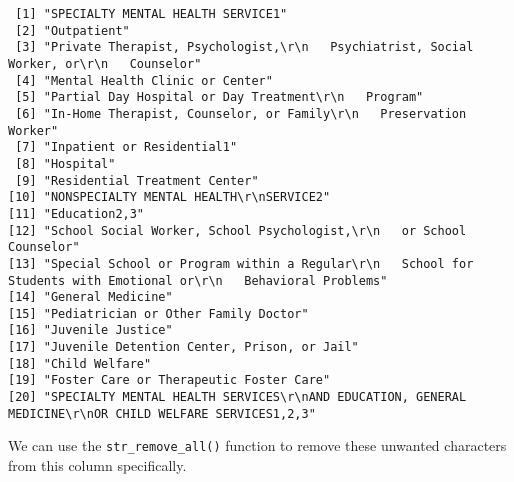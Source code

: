 \documentclass[
]{article}
\begin{document}
\begin{verbatim}
 [1] "SPECIALTY MENTAL HEALTH SERVICE1"                                                                                
 [2] "Outpatient"                                                                                                      
 [3] "Private Therapist, Psychologist,\r\n   Psychiatrist, Social Worker, or\r\n   Counselor"                          
 [4] "Mental Health Clinic or Center"                                                                                  
 [5] "Partial Day Hospital or Day Treatment\r\n   Program"                                                             
 [6] "In-Home Therapist, Counselor, or Family\r\n   Preservation Worker"                                               
 [7] "Inpatient or Residential1"                                                                                       
 [8] "Hospital"                                                                                                        
 [9] "Residential Treatment Center"                                                                                    
[10] "NONSPECIALTY MENTAL HEALTH\r\nSERVICE2"                                                                          
[11] "Education2,3"                                                                                                    
[12] "School Social Worker, School Psychologist,\r\n   or School Counselor"                                            
[13] "Special School or Program within a Regular\r\n   School for Students with Emotional or\r\n   Behavioral Problems"
[14] "General Medicine"                                                                                                
[15] "Pediatrician or Other Family Doctor"                                                                             
[16] "Juvenile Justice"                                                                                                
[17] "Juvenile Detention Center, Prison, or Jail"                                                                      
[18] "Child Welfare"                                                                                                   
[19] "Foster Care or Therapeutic Foster Care"                                                                          
[20] "SPECIALTY MENTAL HEALTH SERVICES\r\nAND EDUCATION, GENERAL MEDICINE\r\nOR CHILD WELFARE SERVICES1,2,3"           
\end{verbatim}

We can use the \texttt{str\_remove\_all()} function to remove these
unwanted characters from this column specifically.
\end{document}
